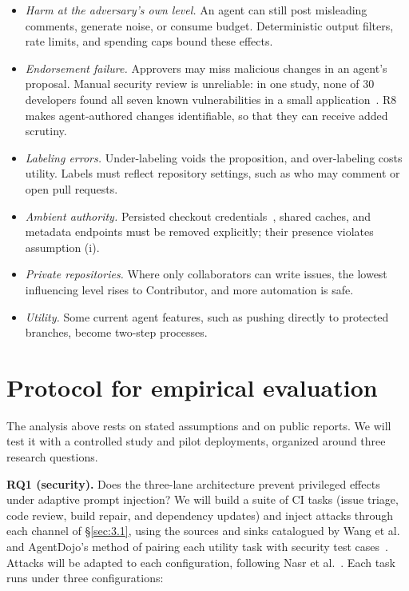\documentclass[acmsmall,screen,review]{acmart}
\begin{document}
\begin{itemize}
\item \emph{Harm at the adversary's own level.} An agent can still post misleading comments, generate noise, or consume budget. Deterministic output filters, rate limits, and spending caps bound these effects.
\item \emph{Endorsement failure.} Approvers may miss malicious changes in an agent's proposal. Manual security review is unreliable: in one study, none of 30 developers found all seven known vulnerabilities in a small application~\cite{edmundson2013empirical}. R8 makes agent-authored changes identifiable, so that they can receive added scrutiny.
\item \emph{Labeling errors.} Under-labeling voids the proposition, and over-labeling costs utility. Labels must reflect repository settings, such as who may comment or open pull requests.
\item \emph{Ambient authority.} Persisted checkout credentials~\cite{githubndactionsa}, shared caches, and metadata endpoints must be removed explicitly; their presence violates assumption (i).
\item \emph{Private repositories.} Where only collaborators can write issues, the lowest influencing level rises to Contributor, and more automation is safe.
\item \emph{Utility.} Some current agent features, such as pushing directly to protected branches, become two-step processes.
\end{itemize}


\section{Protocol for empirical evaluation}\label{sec:9}

The analysis above rests on stated assumptions and on public reports. We will test it with a controlled study and pilot deployments, organized around three research questions.

\textbf{RQ1 (security).} Does the three-lane architecture prevent privileged effects under adaptive prompt injection? We will build a suite of CI tasks (issue triage, code review, build repair, and dependency updates) and inject attacks through each channel of \S\ref{sec:3.1}, using the sources and sinks catalogued by Wang et al.~\cite{wang2026demystifying} and AgentDojo's method of pairing each utility task with security test cases~\cite{debenedetti2024agentdojo}. Attacks will be adapted to each configuration, following Nasr et al.~\cite{nasr2025attacker}. Each task runs under three configurations:
\end{document}
